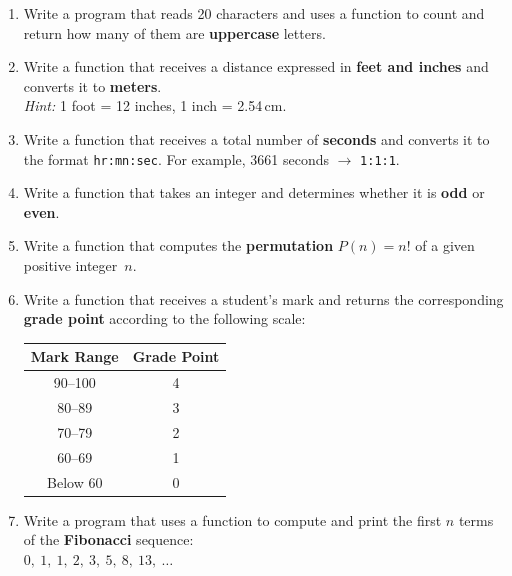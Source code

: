 \begin{enumerate}[leftmargin=*, label=\textbf{Q\arabic*.}]

\item Write a program that reads 20 characters and uses a function to
      count and return how many of them are \textbf{uppercase} letters.

\item Write a function that receives a distance expressed in
      \textbf{feet and inches} and converts it to \textbf{meters}.\\
      \textit{Hint:} 1 foot = 12 inches, 1 inch = 2.54\,cm.

\item Write a function that receives a total number of \textbf{seconds}
      and converts it to the format \texttt{hr:mn:sec}.  For example,
      3661 seconds $\rightarrow$ \texttt{1:1:1}.

\item Write a function that takes an integer and determines whether it
      is \textbf{odd} or \textbf{even}.

\item Write a function that computes the \textbf{permutation}
      $P(n) = n!$ of a given positive integer~$n$.

\item Write a function that receives a student's mark and returns the
      corresponding \textbf{grade point} according to the following
      scale:

      \begin{center}
      \renewcommand{\arraystretch}{1.2}
      \begin{tabular}{@{} c c @{}}
      \toprule
      \textbf{Mark Range} & \textbf{Grade Point} \\
      \midrule
      90--100 & 4 \\
      80--89  & 3 \\
      70--79  & 2 \\
      60--69  & 1 \\
      Below 60 & 0 \\
      \bottomrule
      \end{tabular}
      \end{center}

\item Write a program that uses a function to compute and print the
      first $n$ terms of the \textbf{Fibonacci} sequence:\\
      $0,\ 1,\ 1,\ 2,\ 3,\ 5,\ 8,\ 13,\ \ldots$


\end{enumerate}
